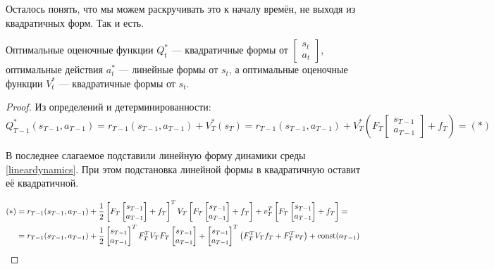 Осталось понять, что мы можем раскручивать это к началу времён, не выходя из квадратичных форм. Так и есть.

\begin{theorem}
Оптимальные оценочные функции $Q_t^*$ --- квадратичные формы от $\begin{bmatrix} s_t \\ a_t \end{bmatrix}$, оптимальные действия $a_t^*$ --- линейные формы от $s_t$, а оптимальные оценочные функции $V_t^*$ --- квадратичные формы от $s_t$.
\begin{proof}
Из определений и детерминированности:
$$Q^*_{T-1}(s_{T-1}, a_{T-1}) = r_{T-1}(s_{T-1}, a_{T-1}) + V^*_T(s_T) = r_{T-1}(s_{T-1}, a_{T-1}) + V^*_T \left( F_T \begin{bmatrix} s_{T-1} \\ a_{T-1} \end{bmatrix} + f_T \right) = (*)$$

В последнее слагаемое подставили линейную форму динамики среды \eqref{lineardynamics}. При этом подстановка линейной формы в квадратичную оставит её квадратичной.

\begin{align*}
    (*) &= r_{T-1}(s_{T-1}, a_{T-1}) + \frac{1}{2} \left[ F_T \begin{bmatrix} s_{T-1} \\ a_{T-1} \end{bmatrix} + f_T \right]^T V_T \left[ F_T \begin{bmatrix} s_{T-1} \\ a_{T-1} \end{bmatrix} + f_T \right] + v_T^T \left[ F_T \begin{bmatrix} s_{T-1} \\ a_{T-1} \end{bmatrix} + f_T \right] = \\
    &= r_{T-1}(s_{T-1}, a_{T-1}) + \frac{1}{2} \begin{bmatrix} s_{T-1} \\ a_{T-1} \end{bmatrix}^T F_T^TV_TF_T \begin{bmatrix} s_{T-1} \\ a_{T-1} \end{bmatrix} + \begin{bmatrix} s_{T-1} \\ a_{T-1} \end{bmatrix}^T \left( F_T^T V_T f_T + F_T^T v_T \right) + \operatorname{const}(a_{T-1})
\end{align*}


\end{proof}
\end{theorem}

